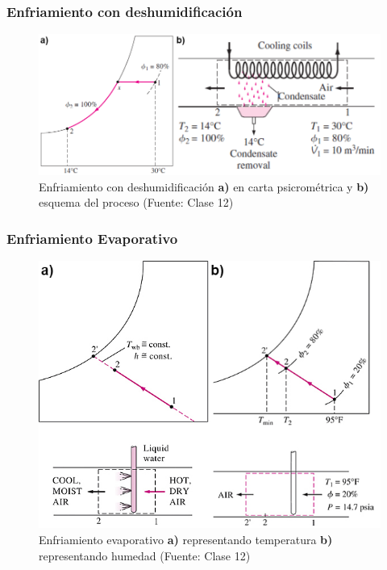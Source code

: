         \subsubsection{Enfriamiento con deshumidificación}
        
        \begin{figure}
            \includegraphics[width=\textwidth]{img/clases/enfr_deshumidificacion.png}
            \caption[Enfriamiento con deshumidificación]{Enfriamiento con deshumidificación \textbf{a)} en carta psicrométrica y \textbf{b)} esquema del proceso (Fuente: Clase 12)}
            \label{fig:enfr_deshumidificacion}
        \end{figure}
        
        \subsubsection{Enfriamiento Evaporativo}
        
        \begin{figure}
            \includegraphics[width=\textwidth]{img/clases/enfr_evap.png}
            \caption[Enfriamiento evaporativo]{Enfriamiento evaporativo \textbf{a)} representando temperatura \textbf{b)} representando humedad (Fuente: Clase 12)}
            \label{fig:enfr_evap}
        \end{figure}
        \newpage
        

